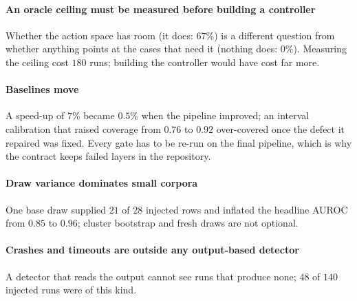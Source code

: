 \paragraph{An oracle ceiling must be measured before building a controller} Whether the action space has room (it does: $67\%$) is a different question from whether anything points at the cases that need it (nothing does: $0\%$).
Measuring the ceiling cost $180$ runs; building the controller would have cost far more.
\paragraph{Baselines move} A speed-up of $7\%$ became $0.5\%$ when the pipeline improved; an interval calibration that raised coverage from $0.76$ to $0.92$ over-covered once the defect it repaired was fixed.
Every gate has to be re-run on the final pipeline, which is why the contract keeps failed layers in the repository.
\paragraph{Draw variance dominates small corpora} One base draw supplied $21$ of $28$ injected rows and inflated the headline AUROC from $0.85$ to $0.96$; cluster bootstrap and fresh draws are not optional.
\paragraph{Crashes and timeouts are outside any output-based detector} A detector that reads the output cannot see runs that produce none; $48$ of $140$ injected runs were of this kind.

